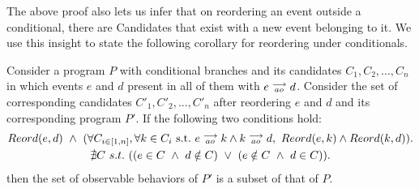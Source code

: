         The above proof also lets us infer that on reordering an event outside a conditional, there are Candidates that exist with a new event belonging to it. 
        We use this insight to state the following corollary for reordering under conditionals. 
        \begin{corollary}
            \label{ReordCond}
            Consider a program $P$ with conditional branches and its candidates $C_1, C_2, ... , C_n$ in which events $e$ and $d$ present in all of them with $e\stackrel{\longrightarrow}{_{ao}}d$. 
            Consider the set of corresponding candidates $C'_1, C'_2, ... , C'_n$ after reordering $e$ and $d$ and its corresponding program $P'$. 
            If the following two conditions hold:
            \begin{gather*}
                Reord(e,d) \ \wedge \ 
                ( \forall C_{i \in [1,n]}, \forall k \in C_i \ \text{s.t.} \ \reln{e}{ao}{k} \wedge \reln{k}{ao}{d}, \    
                Reord(e,k) \wedge Reord(k,d) ). \\
                \nexists C \ s.t. \ 
                    (
                        (e \in C \ \wedge \ d \notin C) \ \vee \ 
                        (e \notin C \ \wedge \ d \in C)
                    ). 
            \end{gather*}
            then the set of observable behaviors of $P'$ is a subset of that of $P$. 
        \end{corollary}

